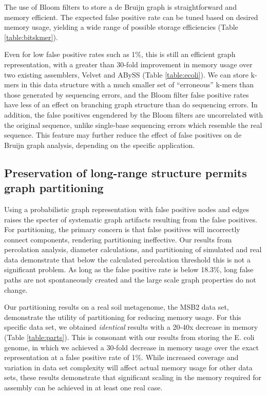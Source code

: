 \documentclass{pnastwo}
\begin{document}
\begin{article}
The use of Bloom filters to store a de Bruijn graph is
straightforward and memory efficient.  The expected false positive
rate can be tuned based on desired memory usage,
yielding a wide range of possible storage efficiencies
(Table \ref{table:bitskmer}).

Even for low false positive rates such as 1\%, this is still an
efficient graph representation, with a greater than 30-fold
improvement in memory usage over two existing assemblers, Velvet and
ABySS (Table \ref{table:ecoli}).  We can store k-mers in this data structure with a much smaller
set of ``erroneous'' k-mers than those generated by sequencing errors,
and the Bloom filter false positive rates have less of an effect on
branching graph structure than do sequencing errors.  In addition, the
false positives engendered by the Bloom filters are uncorrelated with
the original sequence, unlike single-base sequencing errors which resemble
the real sequence.  This feature may further
reduce the effect of false positives on de Bruijn graph analysis,
depending on the specific application.

\subsection{Preservation of long-range structure permits graph partitioning}

Using a probabilistic graph representation with false positive nodes
and edges raises the specter of systematic graph artifacts resulting
from the false positives.  For partitioning, the primary concern is that false
positives will incorrectly connect components, rendering partitioning
ineffective.  Our results from percolation analysis, diameter
calculations, and partitioning of simulated and real data demonstrate that
below the calculated percolation threshold this is not a significant
problem.  As long as the false positive rate is below 18.3\%,
long false paths are not spontaneously created and the
large scale graph properties do not change.

Our partitioning results on a real soil metagenome, the MSB2 data set,
demonstrate the utility of partitioning for reducing memory usage.
For this specific data set, we obtained {\em identical} results with a
20-40x decrease in memory (Table \ref{table:parts}).  This is consonant with our results from
storing the E. coli genome, in which we achieved a 30-fold decrease
in memory usage over the exact representation at a false positive rate
of 1\%.  While increased coverage and variation in data set complexity
will affect actual memory usage for other data sets, these results demonstrate that
significant scaling in the memory required for assembly can be achieved
in at least one real case.


\end{article}
\end{document}
